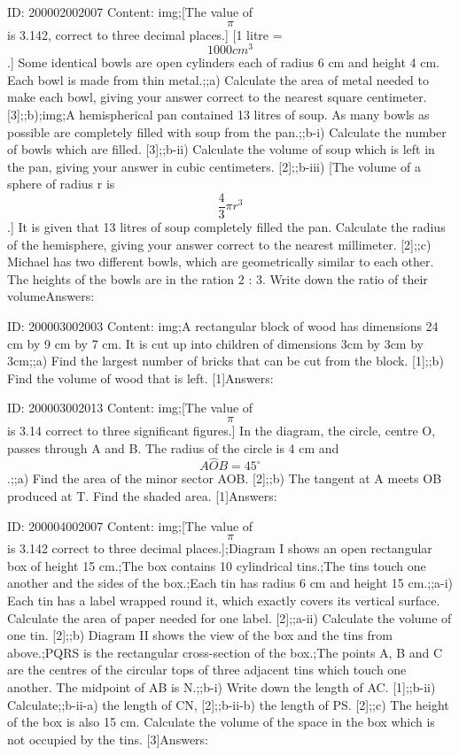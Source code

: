\documentclass{article}
\begin{document}
ID: 200002002007
Content:
img;[The value of $$\pi$$ is 3.142, correct to three decimal places.] [1 litre = $$1000cm^{3} $$.] Some identical bowls are open cylinders each of radius 6 cm and height 4 cm. Each bowl is made from thin metal.;;a) Calculate the area of metal needed to make each bowl, giving your answer correct to the nearest square centimeter. [3];;b);img;A hemispherical pan contained 13 litres of soup. As many bowls as possible are completely filled with soup from the pan.;;b-i) Calculate the number of bowls which are filled. [3];;b-ii) Calculate the volume of soup which is left in the pan, giving your answer in cubic centimeters. [2];;b-iii) [The volume of a sphere of radius r is $$\frac{4}{3}\pi r^{3} $$.] It is given that 13 litres of soup completely filled the pan. Calculate the radius of the hemisphere, giving your answer correct to the nearest millimeter. [2];;c) Michael has two different bowls, which are geometrically similar to each other. The heights of the bowls are in the ration 2 : 3. Write down the ratio of their volumeAnswers:

ID: 200003002003
Content:
img;A rectangular block of wood has dimensions 24 cm by 9 cm by 7 cm. It is cut up into children of dimensions 3cm by 3cm by 3cm;;a) Find the largest number of bricks that can be cut from the block. [1];;b) Find the volume of wood that is left. [1]Answers:

ID: 200003002013
Content:
img;[The value of $$\pi$$ is 3.14 correct to three significant figures.] In the diagram, the circle, centre O, passes through A and B. The radius of the circle is 4 cm and $$A \hat OB = 45^{\circ}$$.;;a) Find the area of the minor sector AOB. [2];;b) The tangent at A meets OB produced at T. Find the shaded area. [1]Answers:

ID: 200004002007
Content:
img;[The value of $$\pi$$ is 3.142 correct to three decimal places.];Diagram I shows an open rectangular box of height 15 cm.;The box contains 10 cylindrical tins.;The tins touch one another and the sides of the box.;Each tin has radius 6 cm and height 15 cm.;;a-i) Each tin has a label wrapped round it, which exactly covers its vertical surface. Calculate the area of paper needed for one label. [2];;a-ii) Calculate the volume of one tin. [2];;b) Diagram II shows the view of the box and the tins from above.;PQRS is the rectangular cross-section of the box.;The points A, B and C are the centres of the circular tops of three adjacent tins which touch one another. The midpoint of AB is N.;;b-i) Write down the length of AC. [1];;b-ii) Calculate;;b-ii-a) the length of CN, [2];;b-ii-b) the length of PS. [2];;c) The height of the box is also 15 cm. Calculate the volume of the space in the box which is not occupied by the tins. [3]Answers:
\end{document}

